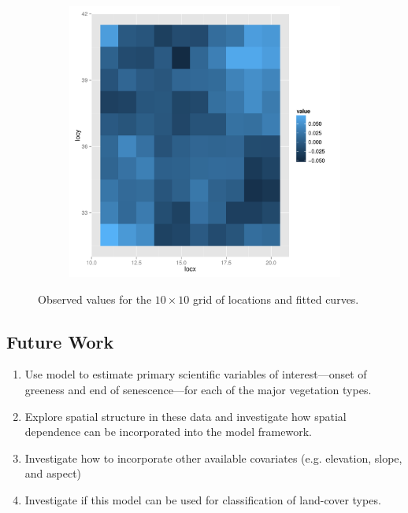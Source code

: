\begin{figure}
\begin{subfigure}[b]{0.3\textwidth}
        \end{subfigure}
          \begin{subfigure}[b]{0.3\textwidth}
                \centering
                \includegraphics[width=\textwidth]{Images-future-work/coef5-spatial.pdf}
        \end{subfigure}
        \caption{Observed values for the $10\times 10$ grid of locations and fitted curves.}
        \label{fig:estimated curves}
\end{figure}





\newpage
\subsection{Future Work}
\begin{enumerate}
\item Use model to estimate primary scientific variables of interest---onset of greeness and end of senescence---for each of the major vegetation types.
\item Explore spatial structure in these data and investigate how spatial dependence can be incorporated into the model framework.
\item Investigate how to incorporate other available covariates (e.g. elevation, slope, and aspect)
\item Investigate if this model can be used for classification of land-cover types.
\end{enumerate}

